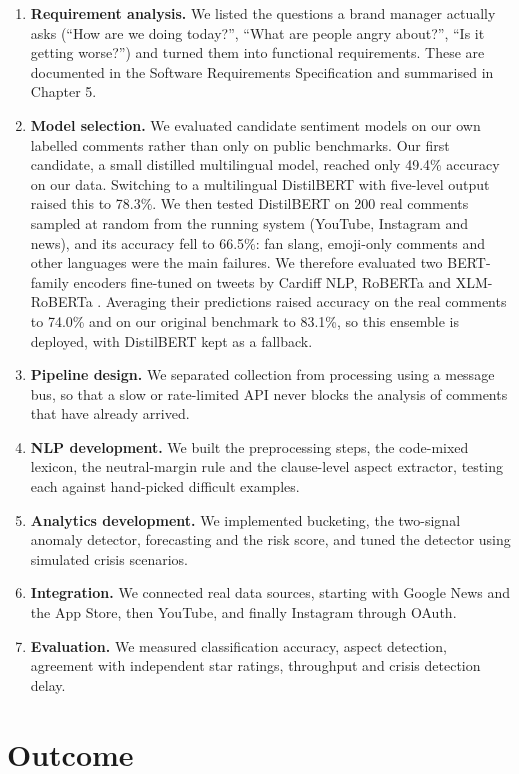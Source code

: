 \documentclass[12pt,a4paper]{report}
\begin{document}
\begin{enumerate}
    \item \textbf{Requirement analysis.} We listed the questions a brand manager actually asks (``How are we doing today?'', ``What are people angry about?'', ``Is it getting worse?'') and turned them into functional requirements. These are documented in the Software Requirements Specification and summarised in Chapter 5.
    \item \textbf{Model selection.} We evaluated candidate sentiment models on our own labelled comments rather than only on public benchmarks. Our first candidate, a small distilled multilingual model, reached only 49.4\% accuracy on our data. Switching to a multilingual DistilBERT with five-level output raised this to 78.3\%. We then tested DistilBERT on 200 real comments sampled at random from the running system (YouTube, Instagram and news), and its accuracy fell to 66.5\%: fan slang, emoji-only comments and other languages were the main failures. We therefore evaluated two BERT-family encoders fine-tuned on tweets by Cardiff NLP, RoBERTa \cite{liu2019roberta,loureiro2022} and XLM-RoBERTa \cite{conneau2020,barbieri2022}. Averaging their predictions raised accuracy on the real comments to 74.0\% and on our original benchmark to 83.1\%, so this ensemble is deployed, with DistilBERT kept as a fallback.
    \item \textbf{Pipeline design.} We separated collection from processing using a message bus, so that a slow or rate-limited API never blocks the analysis of comments that have already arrived.
    \item \textbf{NLP development.} We built the preprocessing steps, the code-mixed lexicon, the neutral-margin rule and the clause-level aspect extractor, testing each against hand-picked difficult examples.
    \item \textbf{Analytics development.} We implemented bucketing, the two-signal anomaly detector, forecasting and the risk score, and tuned the detector using simulated crisis scenarios.
    \item \textbf{Integration.} We connected real data sources, starting with Google News and the App Store, then YouTube, and finally Instagram through OAuth.
    \item \textbf{Evaluation.} We measured classification accuracy, aspect detection, agreement with independent star ratings, throughput and crisis detection delay.
\end{enumerate}

\section{Outcome}
\end{document}
